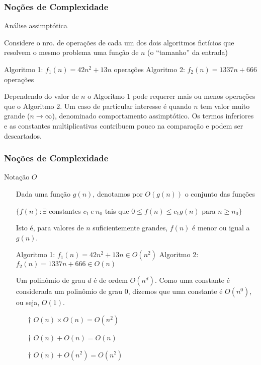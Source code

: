\begin{frame}
\frametitle{Noções de Complexidade}

\begin{block}{Análise assimptótica}
\begin{itemize}
	\bitem Considere o nro. de operações de cada um dos dois algoritmos fictícios que resolvem o mesmo problema uma função de $n$ (o ``tamanho'' da entrada)
	\begin{itemize}
		\bitem Algoritmo 1: $f_1(n) = 42n^2 + 13n$ operações
		\bitem Algoritmo 2: $f_2(n) = 1337n + 666$ operações
	\end{itemize}
	\bitem Dependendo do valor de $n$ o Algoritmo 1 pode requerer mais ou menos operações que o Algoritmo 2.
	\bitem Um caso de particular interesse é quando $n$ tem valor muito grande ($n \rightarrow \infty$), denominado comportamento assimptótico.
	\bitem Os termos inferiores e as constantes multiplicativas contribuem pouco na comparação e podem ser descartados.
\end{itemize}
\end{block}
\end{frame}

\begin{frame}
\frametitle{Noções de Complexidade}

\begin{block}{Notação $O$}
\begin{itemize}
	\item[] Dada uma função $g(n)$, denotamos por $O(g(n))$ o conjunto das funções\\
		\begin{center}$\{f(n) : \exists$ constantes $c_1\ e\ n_0$ tais que $0 \leq f(n) \leq c_1g(n)$ para $n \geq n_0\}$\end{center}

	\item[] Isto é, para valores de $n$ suficientemente grandes, $f(n)$ é menor ou igual a $g(n)$.
	
	\begin{itemize}
		\bitem Algoritmo 1: $f_1(n) = 42n^2 + 13n \in O(n^2)$
		\bitem Algoritmo 2: $f_2(n) = 1337n + 666 \in O(n)$
	\end{itemize}
	
	\item[] Um polinômio de grau $d$ é de ordem $O(n^d)$. Como uma constante é considerada um polinômio de grau 0, dizemos que uma constante é $O(n^0)$, ou seja, $O(1)$.

	\begin{itemize}
	\tiny	
	\item[$\dagger$] $O(n) \times O(n) = O(n^2)$
	\item[$\dagger$] $O(n) + O(n) = O(n)$
	\item[$\dagger$] $O(n) + O(n^2) = O(n^2)$
	\end{itemize}
\end{itemize}
\end{block}
\end{frame}

